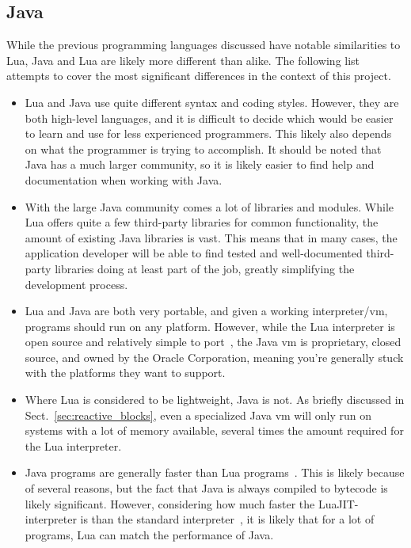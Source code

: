 \subsection{Java}
\label{sec:lua_vs_java}
While the previous programming languages discussed have notable similarities to Lua, Java and Lua are likely more different than alike. The following list attempts to cover the most significant differences in the context of this project.

\begin{itemize}
	\item Lua and Java use quite different syntax and coding styles. However, they are both high-level languages, and it is difficult to decide which would be easier to learn and use for less experienced programmers. This likely also depends on what the programmer is trying to accomplish. It should be noted that Java has a much larger community, so it is likely easier to find help and documentation when working with Java.
	\item With the large Java community comes a lot of libraries and modules. While Lua offers quite a few third-party libraries for common functionality, the amount of existing Java libraries is vast. This means that in many cases, the application developer will be able to find tested and well-documented third-party libraries doing at least part of the job, greatly simplifying the development process.
	\item Lua and Java are both very portable, and given a working interpreter/\gls{vm}, programs should run on any platform. However, while the Lua interpreter is open source and relatively simple to port~\cite{chapter:porting_lua_microcontroller}, the Java \gls{vm} is proprietary, closed source, and owned by the Oracle Corporation, meaning you're generally stuck with the platforms they want to support.
	\item Where Lua is considered to be lightweight, Java is not. As briefly discussed in Sect.~\ref{sec:reactive_blocks}, even a specialized Java \gls{vm} will only run on systems with a lot of memory available, several times the amount required for the Lua interpreter.
	\item Java programs are generally faster than Lua programs~\cite{website:computer_language_benchmarks_game}. This is likely because of several reasons, but the fact that Java is always compiled to bytecode is likely significant. However, considering how much faster the LuaJIT-interpreter is than the standard interpreter~\cite{website:luajit_performance}, it is likely that for a lot of programs, Lua can match the performance of Java.
\end{itemize}

